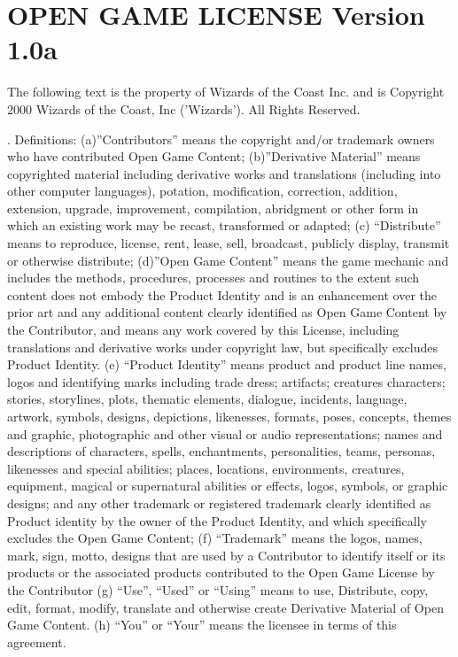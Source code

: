 \chapter{OPEN GAME LICENSE  Version 1.0a}

\begin{scriptsize}
\noindent The following text is the property of Wizards of the Coast Inc. and is Copyright 2000 Wizards of the Coast, Inc ('Wizards'). All Rights Reserved.

. Definitions: (a)”Contributors” means the copyright and/or trademark owners who have contributed Open Game Content; (b)”Derivative Material” means copyrighted material including derivative works and translations (including into other computer languages), potation, modification, correction, addition, extension, upgrade, improvement, compilation, abridgment or other form in which an existing work may be recast, transformed or adapted; (c) “Distribute” means to reproduce, license, rent, lease, sell, broadcast, publicly display, transmit or otherwise distribute; (d)”Open Game Content” means the game mechanic and includes the methods, procedures, processes and routines to the extent such content does not embody the Product Identity and is an enhancement over the prior art and any additional content clearly identified as Open Game Content by the Contributor, and means any work covered by this License, including translations and derivative works under copyright law, but specifically excludes Product Identity. (e) “Product Identity” means product and product line names, logos and identifying marks including trade dress; artifacts; creatures characters; stories, storylines, plots, thematic elements, dialogue, incidents, language, artwork, symbols, designs, depictions, likenesses, formats, poses, concepts, themes and graphic, photographic and other visual or audio representations; names and descriptions of characters, spells, enchantments, personalities, teams, personas, likenesses and special abilities; places, locations, environments, creatures, equipment, magical or supernatural abilities or effects, logos, symbols, or graphic designs; and any other trademark or registered trademark clearly identified as Product identity by the owner of the Product Identity, and which specifically excludes the Open Game Content; (f) “Trademark” means the logos, names, mark, sign, motto, designs that are used by a Contributor to identify itself or its products or the associated products contributed to the Open Game License by the Contributor (g) “Use”, “Used” or “Using” means to use, Distribute, copy, edit, format, modify, translate and otherwise create Derivative Material of Open Game Content. (h) “You” or “Your” means the licensee in terms of this agreement.


\end{scriptsize}
